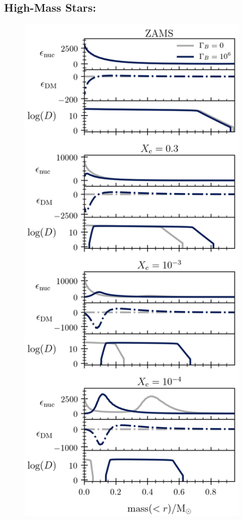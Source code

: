 \documentclass[useAMS,usenatbib]{mnras}
\begin{document}
\subsection{High-Mass Stars: \mrangehigh}
\label{sub:highmass}

  \begin{figure}
    \centering
    \includegraphics[width=\textwidth]{plots/m3p5.png}

\end{figure}
\end{document}
